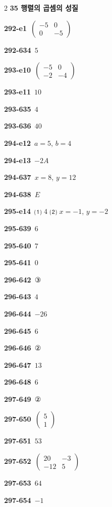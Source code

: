 \documentclass[10pt,a4paper]{article}
\begin{document}
\begin{multicols}{2}
\noindent\textbf{35 행렬의 곱셈의 성질}\par\smallskip
\noindent\textbf{292-e1}\ $\begin{pmatrix} -5 & 0 \\ 0 & -5 \end{pmatrix}$\par
\noindent\textbf{292-634}\ $5$\par
\noindent\textbf{293-e10}\ $\begin{pmatrix} -5 & 0 \\ -2 & -4 \end{pmatrix}$\par
\noindent\textbf{293-e11}\ $10$\par
\noindent\textbf{293-635}\ $4$\par
\noindent\textbf{293-636}\ $40$\par
\noindent\textbf{294-e12}\ $a=5$, $b=4$\par
\noindent\textbf{294-e13}\ $-2A$\par
\noindent\textbf{294-637}\ $x=8$, $y=12$\par
\noindent\textbf{294-638}\ $E$\par
\noindent\textbf{295-e14}\ ⑴ $4$ ⑵ $x=-1$, $y=-2$\par
\noindent\textbf{295-639}\ $6$\par
\noindent\textbf{295-640}\ $7$\par
\noindent\textbf{295-641}\ $0$\par
\noindent\textbf{296-642}\ ③\par
\noindent\textbf{296-643}\ $4$\par
\noindent\textbf{296-644}\ $-26$\par
\noindent\textbf{296-645}\ $6$\par
\noindent\textbf{296-646}\ ②\par
\noindent\textbf{296-647}\ $13$\par
\noindent\textbf{296-648}\ $6$\par
\noindent\textbf{297-649}\ ②\par
\noindent\textbf{297-650}\ $\begin{pmatrix} 5 \\ 1 \end{pmatrix}$\par
\noindent\textbf{297-651}\ $53$\par
\noindent\textbf{297-652}\ $\begin{pmatrix} 20 & -3 \\ -12 & 5 \end{pmatrix}$\par
\noindent\textbf{297-653}\ $64$\par
\noindent\textbf{297-654}\ $-1$\par
\end{multicols}
\end{document}
